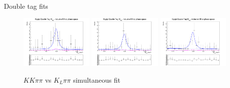 \documentclass{beamer}
\begin{document}
\begin{frame}{Double tag fits}
\begin{figure}
    \includegraphics[width=0.32\textwidth, clip = true, trim = {0 11cm 0 0}]{Plots/DoubleTagYield_DoubleTag_SCMB_KKpipi_vs_KLpipi_SignalBin0_TagBin6.png}
    \includegraphics[width=0.32\textwidth, clip = true, trim = {0 11cm 0 0}]{Plots/DoubleTagYield_DoubleTag_SCMB_KKpipi_vs_KLpipi_SignalBin0_TagBin7.png}
    \includegraphics[width=0.32\textwidth, clip = true, trim = {0 11cm 0 0}]{Plots/DoubleTagYield_DoubleTag_SCMB_KKpipi_vs_KLpipi_SignalBin0_TagBin8.png}
    \caption{$KK\pi\pi$ vs $K_L\pi\pi$ simultaneous fit}
  \end{figure}
\end{frame}
\end{document}
